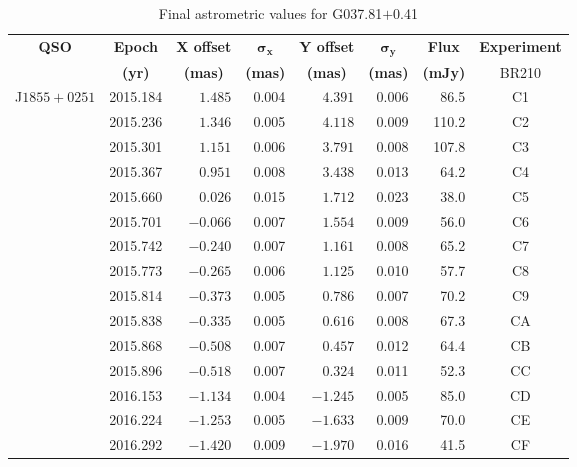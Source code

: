 	\begin{table}[h]
		\onehalfspacing
		\footnotesize
		\centering
		\caption{Final astrometric values for G037.81$+$0.41}
		\label{tab:g037_position}
		\begin{tabular}{lrrrrrrc} \toprule
			\multicolumn{1}{c}{\bf QSO}&\multicolumn{1}{c}{\bf Epoch} & \multicolumn{1}{c}{\bf X offset} & \multicolumn{1}{c}{$\boldsymbol{\sigma_x}$} & \multicolumn{1}{c}{\bf Y offset} & \multicolumn{1}{c}{$\boldsymbol{\sigma_y}$} & \multicolumn{1}{c}{\bf Flux} & \multicolumn{1}{c}{\bf Experiment} \\
			\multicolumn{1}{c}{}&\multicolumn{1}{c}{\bf (yr)} & \multicolumn{1}{c}{\bf (mas)} & \multicolumn{1}{c}{\bf (mas)} & \multicolumn{1}{c}{\bf (mas)} & \multicolumn{1}{c}{\bf (mas)} & \multicolumn{1}{c}{\bf (mJy)} & \multicolumn{1}{c}{BR210} \\ \midrule   
			J$1855+0251$&2015.184  & $ 1.485$ &  0.004   &  $ 4.391$  &  0.006 &  86.5  & C1 \\
						&2015.236  & $ 1.346$ &  0.005   &  $ 4.118$  &  0.009 & 110.2  & C2 \\
						&2015.301  & $ 1.151$ &  0.006   &  $ 3.791$  &  0.008 & 107.8  & C3 \\
						&2015.367  & $ 0.951$ &  0.008   &  $ 3.438$  &  0.013 &  64.2  & C4 \\
						&2015.660  & $ 0.026$ &  0.015   &  $ 1.712$  &  0.023 &  38.0  & C5 \\
						&2015.701  & $-0.066$ &  0.007   &  $ 1.554$  &  0.009 &  56.0  & C6 \\
						&2015.742  & $-0.240$ &  0.007   &  $ 1.161$  &  0.008 &  65.2  & C7 \\
						&2015.773  & $-0.265$ &  0.006   &  $ 1.125$  &  0.010 &  57.7  & C8 \\
						&2015.814  & $-0.373$ &  0.005   &  $ 0.786$  &  0.007 &  70.2  & C9 \\
						&2015.838  & $-0.335$ &  0.005   &  $ 0.616$  &  0.008 &  67.3  & CA \\
						&2015.868  & $-0.508$ &  0.007   &  $ 0.457$  &  0.012 &  64.4  & CB \\
						&2015.896  & $-0.518$ &  0.007   &  $ 0.324$  &  0.011 &  52.3  & CC \\
						&2016.153  & $-1.134$ &  0.004   &  $-1.245$  &  0.005 &  85.0  & CD \\
						&2016.224  & $-1.253$ &  0.005   &  $-1.633$  &  0.009 &  70.0  & CE \\
						&2016.292  & $-1.420$ &  0.009   &  $-1.970$  &  0.016 &  41.5  & CF \\

\end{tabular}
\end{table}
